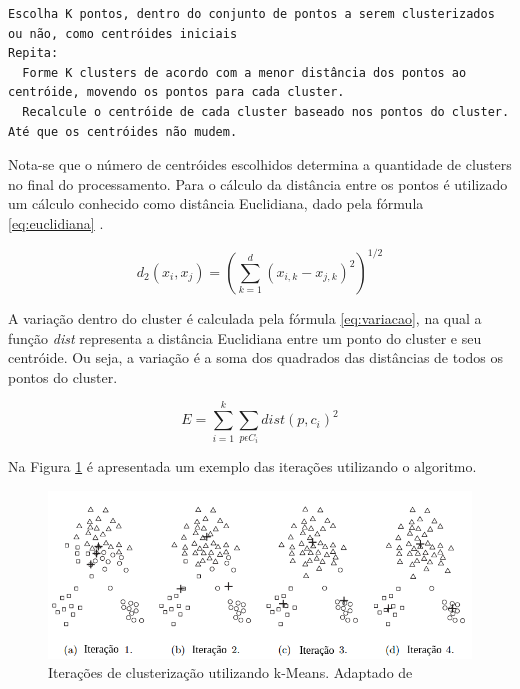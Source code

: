 \lstset{language=HTML, numbers=left, stepnumber=1}
\begin{lstlisting}
Escolha K pontos, dentro do conjunto de pontos a serem clusterizados ou não, como centróides iniciais
Repita:
  Forme K clusters de acordo com a menor distância dos pontos ao centróide, movendo os pontos para cada cluster.
  Recalcule o centróide de cada cluster baseado nos pontos do cluster.
Até que os centróides não mudem.
\end{lstlisting}

Nota-se que o número de centróides escolhidos determina a quantidade de clusters no final do processamento.
Para o cálculo da distância entre os pontos é utilizado um cálculo conhecido como distância Euclidiana, 
dado pela fórmula \ref{eq:euclidiana} \cite{clustering_review, tan2013data, han2011data}.

\begin{equation} \label{eq:euclidiana}
  d_{2}(x_i, x_j) = (\sum_{k=1}^{d} (x_{i,k} - x_{j,k})^2)^{1/2}
\end{equation}

A variação dentro do cluster é calculada pela fórmula \ref{eq:variacao}, na qual a 
função \textit{dist} representa a distância Euclidiana entre um ponto do
cluster e seu centróide. Ou seja, a variação é a soma dos quadrados
das distâncias de todos os pontos do cluster.

\begin{equation} \label{eq:variacao}
  E = \sum_{i=1}^{k} \sum_{p \epsilon C_{i}} dist(p, c_i)^2
\end{equation}

Na Figura \ref{fig:iteracoes_kmeans} é apresentada um exemplo das iterações utilizando o algoritmo.

\begin{figure}[h!]
\centering
\includegraphics[scale=0.6]{figuras/iteracoes_kmeans.png}
\caption{Iterações de clusterização utilizando k-Means. Adaptado de }
\label{fig:iteracoes_kmeans}
\end{figure}

